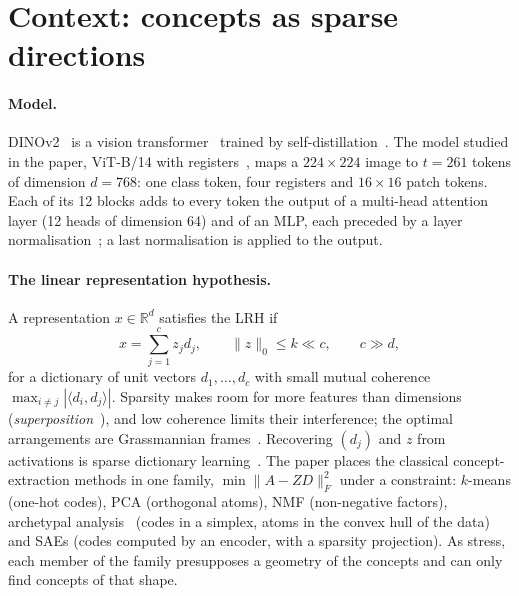 \documentclass[sigconf,nonacm,screen]{acmart}
\newcommand{\R}{\mathbb{R}}
\begin{document}
\section{Context: concepts as sparse directions}
\label{sec:context}

\paragraph{Model.} DINOv2~\cite{oquab2024dinov2} is a vision transformer~\cite{dosovitskiy2021image}
trained by self-distillation~\cite{caron2021emerging,zhou2022ibot}. The model studied in the paper, ViT-B/14
with registers~\cite{darcet2024registers}, maps a $224\times224$ image to $t=261$ tokens of dimension
$d=768$: one class token, four registers and $16\times16$ patch tokens. Each of its 12 blocks adds to
every token the output of a multi-head attention layer (12 heads of dimension 64) and of an MLP, each
preceded by a layer normalisation~\cite{ba2016layer}; a last normalisation is applied to the output.

\paragraph{The linear representation hypothesis.} A representation $x\in\R^d$ satisfies the LRH if
\begin{equation}
  x=\sum_{j=1}^{c} z_j d_j ,\qquad \|z\|_0\le k\ll c,\qquad c\gg d,
  \label{eq:lrh}
\end{equation}
for a dictionary of unit vectors $d_1,\dots,d_c$ with small mutual coherence $\max_{i\neq j}|\langle
d_i,d_j\rangle|$. Sparsity makes room for more features than dimensions
(\emph{superposition}~\cite{elhage2022superposition}), and low coherence limits their interference; the
optimal arrangements are Grassmannian frames~\cite{strohmer2003grassmannian}. Recovering $(d_j)$ and $z$
from activations is sparse dictionary learning~\cite{olshausen1996emergence}. The paper places the classical
concept-extraction methods in one family, $\min\|A-ZD\|_F^2$ under a constraint: $k$-means (one-hot codes),
PCA (orthogonal atoms), NMF (non-negative factors), archetypal analysis~\cite{cutler1994archetypal} (codes
in a simplex, atoms in the convex hull of the data) and SAEs (codes computed by an encoder, with a
sparsity projection). As \citet{hindupur2025projecting} stress, each member of the family presupposes a
geometry of the concepts and can only find concepts of that shape.
\end{document}
